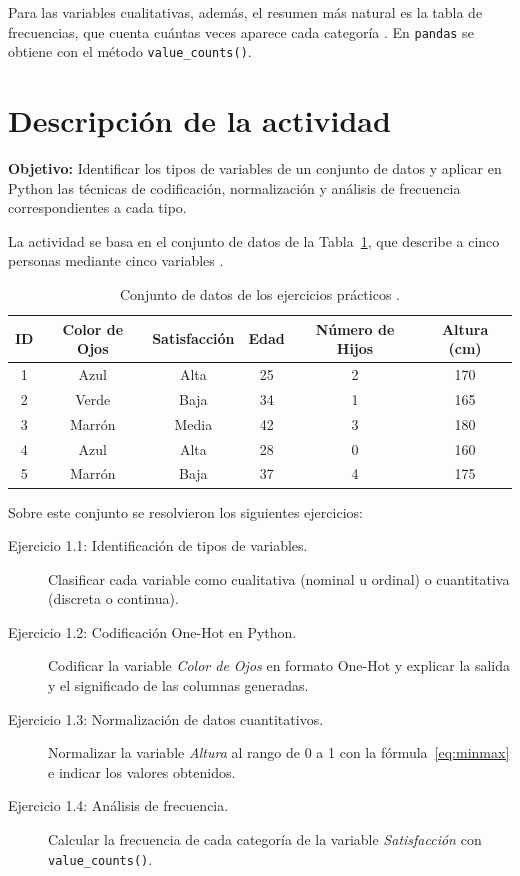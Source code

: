 \documentclass[11pt,letterpaper]{article}
\begin{document}
Para las variables cualitativas, además, el resumen más natural es la tabla de frecuencias, que cuenta cuántas veces aparece cada categoría \parencite{guisande2013}. En \texttt{pandas} se obtiene con el método \texttt{value\_counts()}.

\section{Descripción de la actividad}

\textbf{Objetivo:} Identificar los tipos de variables de un conjunto de datos y aplicar en Python las técnicas de codificación, normalización y análisis de frecuencia correspondientes a cada tipo.

La actividad se basa en el conjunto de datos de la Tabla~\ref{tab:datos}, que describe a cinco personas mediante cinco variables \parencite{tecnm2026_documento_fuente}.

\begin{table}[htbp]
\centering
\caption{Conjunto de datos de los ejercicios prácticos \parencite{tecnm2026_documento_fuente}.}
\label{tab:datos}
\begin{tabular}{cccccc}
\hline
\textbf{ID} & \textbf{Color de Ojos} & \textbf{Satisfacción} & \textbf{Edad} & \textbf{Número de Hijos} & \textbf{Altura (cm)} \\
\hline
1 & Azul   & Alta  & 25 & 2 & 170 \\
2 & Verde  & Baja  & 34 & 1 & 165 \\
3 & Marrón & Media & 42 & 3 & 180 \\
4 & Azul   & Alta  & 28 & 0 & 160 \\
5 & Marrón & Baja  & 37 & 4 & 175 \\
\hline
\end{tabular}
\end{table}

Sobre este conjunto se resolvieron los siguientes ejercicios:

\begin{description}
    \item[Ejercicio 1.1: Identificación de tipos de variables.] Clasificar cada variable como cualitativa (nominal u ordinal) o cuantitativa (discreta o continua).
    \item[Ejercicio 1.2: Codificación One-Hot en Python.] Codificar la variable \textit{Color de Ojos} en formato One-Hot y explicar la salida y el significado de las columnas generadas.
    \item[Ejercicio 1.3: Normalización de datos cuantitativos.] Normalizar la variable \textit{Altura} al rango de 0 a 1 con la fórmula~\eqref{eq:minmax} e indicar los valores obtenidos.
    \item[Ejercicio 1.4: Análisis de frecuencia.] Calcular la frecuencia de cada categoría de la variable \textit{Satisfacción} con \texttt{value\_counts()}.
\end{description}
\end{document}
